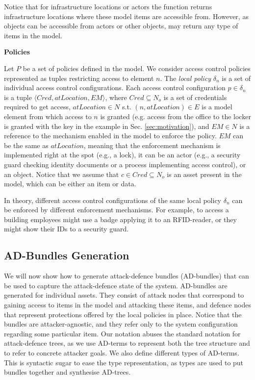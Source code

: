 \documentclass{llncs}
\begin{document}
Notice that for infrastructure locations or actors the function \loc{} returns infrastructure locations where these model items are accessible from. However, as objects can be accessible from actors or other objects, \loc{} may return any type of items in the model. 

\textbf{Policies}

Let $P$ be a set of policies defined in the model. We consider access control policies represented as tuples restricting access to element $n$. The \emph{local policy} $\delta_n$ is a set of individual access control configurations. Each access control configuration $p \in \delta_n$ is a tuple $\langle Cred, atLocation, EM\rangle $, where $Cred \subseteq N_o$ is a set of credentials required to get access, $atLocation \in N$ s.t. $(n, atLocation) \in E$ is a model element from which access to $n$ is granted (e.g. access from the office to the locker is granted with the key in the example in Sec. \ref{sec:motivation}), and $EM \in N$ is a reference to the mechanism enabled in the model to enforce the policy. $EM$ can be the same as $atLocation$, meaning that the enforcement mechanism is implemented right at the spot (e.g., a lock), it can be an actor (e.g., a security guard checking identity documents or a process implementing access control), or an object. Notice that we assume that $c \in Cred \subseteq N_o$ is an asset present in the model, which can be either an item or data. 

In theory, different access control configurations of the same local policy $\delta_n$ can be enforced by different enforcement mechanisms. For example, to access a building employees might use a badge applying it to an RFID-reader, or they might show their IDs to a security guard. 


\subsection{AD-Bundles Generation}\label{subsec:generation}






We will now show how to generate attack-defence bundles (AD-bundles) that can be used to capture the attack-defence state of the system.
AD-bundles are generated for individual assets. They consist of attack nodes that correspond to gaining access to items in the model and attacking these items, and defence nodes that represent protections offered by the local policies in place. Notice that the bundles are attacker-agnostic, and they refer only to the system configuration regarding some particular item. Our notation abuses the standard notation for attack-defence trees, as we use AD-terms to represent both the tree structure and to refer to concrete attacker goals. We also define different types of AD-terms. This is syntactic sugar to ease the type representation, as types are used to put bundles together and synthesise AD-trees.
\end{document}
